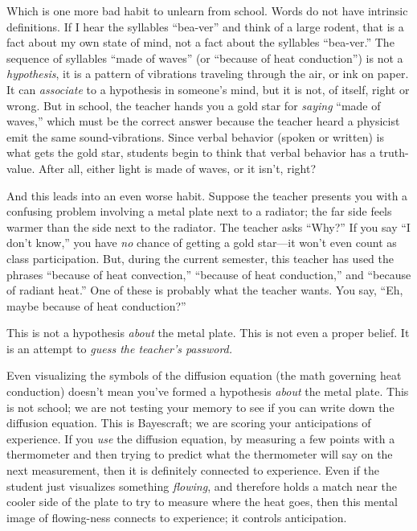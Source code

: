 {
 Which is one more bad habit to unlearn from school. Words do not
have intrinsic definitions. If I hear the syllables
``bea-ver'' and think of a large
rodent, that is a fact about my own state of mind, not a fact about the
syllables ``bea-ver.'' The sequence
of syllables ``made of waves'' (or
``because of heat conduction'') is
not a \textit{hypothesis}, it is a pattern of vibrations traveling
through the air, or ink on paper. It can \textit{associate} to a
hypothesis in someone's mind, but it is not, of itself,
right or wrong. But in school, the teacher hands you a gold star for
\textit{saying} ``made of waves,''
which must be the correct answer because the teacher heard a physicist
emit the same sound-vibrations. Since verbal behavior (spoken or
written) is what gets the gold star, students begin to think that
verbal behavior has a truth-value. After all, either light is made of
waves, or it isn't, right?}

{
 And this leads into an even worse habit. Suppose the teacher
presents you with a confusing problem involving a metal plate next to a
radiator; the far side feels warmer than the side next to the radiator.
The teacher asks ``Why?'' If you say
``I don't know,''
you have \textit{no} chance of getting a gold star---it
won't even count as class participation. But, during
the current semester, this teacher has used the phrases
``because of heat convection,''
``because of heat conduction,'' and
``because of radiant heat.'' One of
these is probably what the teacher wants. You say,
``Eh, maybe because of heat
conduction?''}

{
 This is not a hypothesis \textit{about} the metal plate. This is
not even a proper belief. It is an attempt to \textit{guess the
teacher's password.}}

{
 Even visualizing the symbols of the diffusion equation (the math
governing heat conduction) doesn't mean
you've formed a hypothesis \textit{about} the metal
plate. This is not school; we are not testing your memory to see if you
can write down the diffusion equation. This is Bayescraft; we are
scoring your anticipations of experience. If you \textit{use} the
diffusion equation, by measuring a few points with a thermometer and
then trying to predict what the thermometer will say on the next
measurement, then it is definitely connected to experience. Even if the
student just visualizes something \textit{flowing}, and therefore holds
a match near the cooler side of the plate to try to measure where the
heat goes, then this mental image of flowing-ness connects to
experience; it controls anticipation.}

